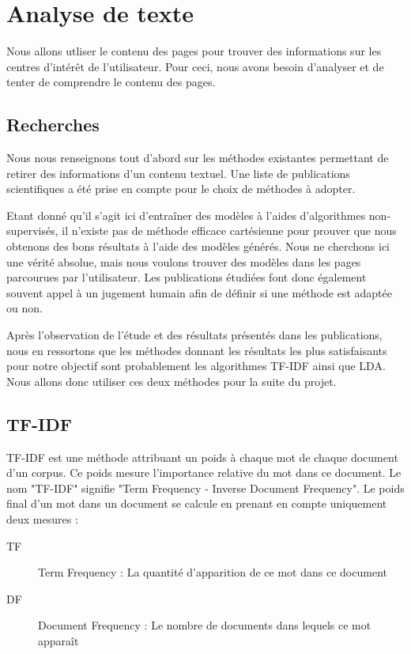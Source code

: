 \section{Analyse de texte}

	Nous allons utliser le contenu des pages pour trouver des informations sur les centres d'intérêt de l'utilisateur. Pour ceci, nous avons besoin d'analyser et de tenter de comprendre le contenu des pages.

	\subsection{Recherches}

		Nous nous renseignons tout d'abord sur les méthodes existantes permettant de retirer des informations d'un contenu textuel. Une liste de publications scientifiques a été prise en compte pour le choix de méthodes à adopter.\cite{text-analysis-src4}\cite{text-analysis-src5}\cite{text-analysis-src6}

		Etant donné qu'il s'agit ici d'entraîner des modèles à l'aides d'algorithmes non-supervisés, il n'existe pas de méthode efficace cartésienne pour prouver que nous obtenons des bons résultats à l'aide des modèles générés. Nous ne cherchons ici une vérité absolue, mais nous voulons trouver des modèles dans les pages parcourues par l'utilisateur. Les publications étudiées font donc également souvent appel à un jugement humain afin de définir si une méthode est adaptée ou non.

		Après l'observation de l'étude et des résultats présentés dans les publications, nous en ressortons que les méthodes donnant les résultats les plus satisfaisants pour notre objectif sont probablement les algorithmes TF-IDF ainsi que LDA. Nous allons donc utiliser ces deux méthodes pour la suite du projet.

	\subsection{TF-IDF}\label{analyse-tfidf}

		TF-IDF est une méthode attribuant un poids à chaque mot de chaque document d'un corpus. Ce poids mesure l'importance relative du mot dans ce document. Le nom "TF-IDF" signifie "Term Frequency - Inverse Document Frequency". Le poids final d'un mot dans un document se calcule en prenant en compte uniquement deux mesures :
		\begin{description}
			\item[TF] Term Frequency : La quantité d'apparition de ce mot dans ce document
			\item[DF] Document Frequency : Le nombre de documents dans lequels ce mot apparaît
		\end{description}

